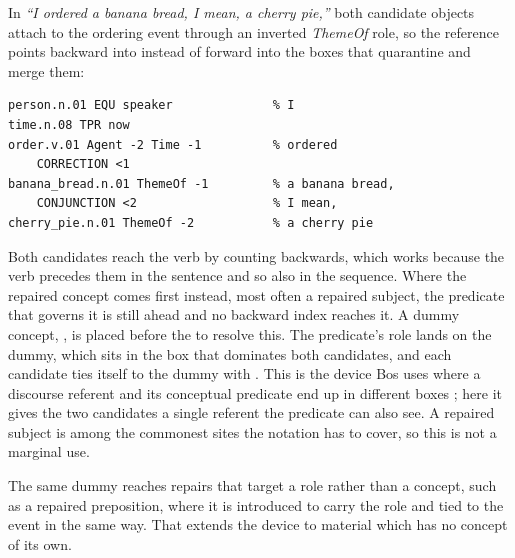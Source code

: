 \documentclass{article}
\begin{document}
In \textit{``I ordered a banana bread, I mean, a cherry pie,''} both candidate
objects attach to the ordering event through an inverted \emph{ThemeOf} role,
so the reference points backward into  instead of forward into
the boxes that quarantine and merge them:

\begin{lstlisting}[style=sbn]
person.n.01 EQU speaker              % I
time.n.08 TPR now
order.v.01 Agent -2 Time -1          % ordered
    CORRECTION <1
banana_bread.n.01 ThemeOf -1         % a banana bread,
    CONJUNCTION <2                   % I mean,
cherry_pie.n.01 ThemeOf -2           % a cherry pie
\end{lstlisting}

Both candidates reach the verb by counting backwards, which works because the
verb precedes them in the sentence and so also in the sequence. Where the
repaired concept comes first instead, most often a repaired subject, the
predicate that governs it is still ahead and no backward index reaches it. A
dummy concept, , is placed before the 
to resolve this. The predicate's role lands on the dummy, which sits in the box
that dominates both candidates, and each candidate ties itself to the dummy with
. This is the device Bos uses where a discourse referent and its
conceptual predicate end up in different boxes \citep{bosSBN}; here it gives the
two candidates a single referent the predicate can also see. A repaired subject
is among the commonest sites the notation has to cover, so this is not a
marginal use.

The same dummy reaches repairs that target a role rather than a concept, such as
a repaired preposition, where it is introduced to carry the role and tied to the
event in the same way. That extends the device to material which has no concept
of its own.
\end{document}
